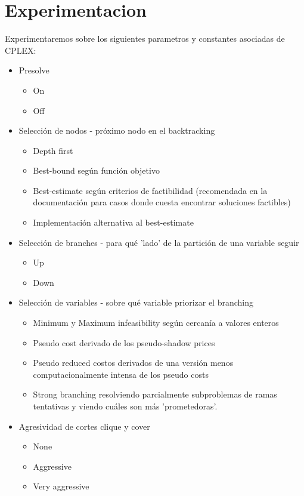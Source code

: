 \section{Experimentacion}

Experimentaremos sobre los siguientes parametros y constantes asociadas de CPLEX:
\begin{itemize}
    \item Presolve
        \begin{itemize}
            \item On
            \item Off
        \end{itemize}
    \item Selección de nodos - próximo nodo en el backtracking
        \begin{itemize}
            \item Depth first
            \item Best-bound según función objetivo
            \item Best-estimate según criterios de factibilidad (recomendada en la documentación para casos donde cuesta encontrar soluciones factibles)
            \item Implementación alternativa al best-estimate
        \end{itemize}
    \item Selección de branches - para qué 'lado' de la partición de una variable seguir
        \begin{itemize}
            \item Up
            \item Down
        \end{itemize}
    \item Selección de variables - sobre qué variable priorizar el branching
        \begin{itemize}
            \item Minimum y Maximum infeasibility según cercanía a valores enteros
            \item Pseudo cost derivado de los pseudo-shadow prices
            \item Pseudo reduced costos derivados de una versión menos computacionalmente intensa de los pseudo costs
            \item Strong branching resolviendo parcialmente subproblemas de ramas tentativas y viendo cuáles son más 'prometedoras'. 
        \end{itemize}
    \item Agresividad de cortes clique y cover
        \begin{itemize}
        \item None
        \item Aggressive
        \item Very aggressive
        \end{itemize}
\end{itemize}

